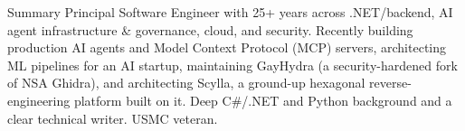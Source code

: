\documentclass{resume} %
\begin{document}

\begin{rSection}{Summary}
Principal Software Engineer with 25+ years across .NET/backend, AI agent infrastructure \& governance, cloud, and security. Recently building production AI agents and Model Context Protocol (MCP) servers, architecting ML pipelines for an AI startup, maintaining GayHydra (a security-hardened fork of NSA Ghidra), and architecting Scylla, a ground-up hexagonal reverse-engineering platform built on it. Deep C\#/.NET and Python background and a clear technical writer. USMC veteran.
\end{rSection}


\end{document}
